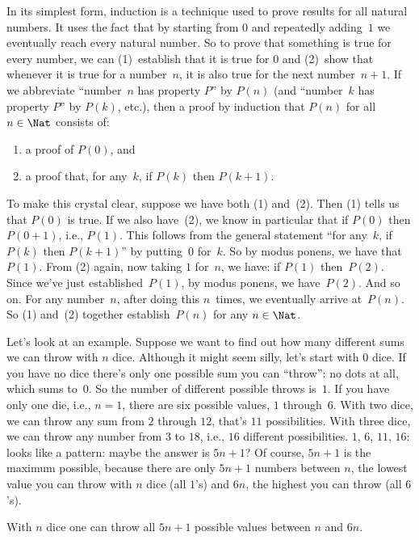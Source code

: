 \documentclass[../../../include/open-logic-section]{subfiles}
\begin{document}


In its simplest form, induction is a technique used to prove results
for all natural numbers. It uses the fact that by starting from $0$
and repeatedly adding~$1$ we eventually reach every natural number. So
to prove that something is true for every number, we can (1)~establish
that it is true for $0$ and (2)~show that whenever it is true for a
number~$n$, it is also true for the next number~$n+1$.  If we
abbreviate ``number~$n$ has property $P$'' by $P(n)$ (and ``number~$k$
has property $P$'' by $P(k)$, etc.), then a proof by induction that
$P(n)$ for all $n \in \Nat$ consists of:
\begin{enumerate}
\item a proof of $P(0)$, and
\item a proof that, for any~$k$, if $P(k)$ then $P(k+1)$.
\end{enumerate}
To make this crystal clear, suppose we have both (1) and~(2).  Then
(1) tells us that $P(0)$ is true.  If we also have~(2), we know in
particular that if $P(0)$ then $P(0+1)$, i.e., $P(1)$. This follows
from the general statement ``for any~$k$, if $P(k)$ then $P(k+1)$'' by
putting~$0$ for~$k$. So by modus ponens, we have that~$P(1)$. From (2)
again, now taking $1$ for~$n$, we have: if $P(1)$ then~$P(2)$. Since
we've just established~$P(1)$, by modus ponens, we have~$P(2)$. And so
on.  For any number~$n$, after doing this $n$~times, we eventually
arrive at~$P(n)$.  So (1) and~(2) together establish~$P(n)$ for any $n
\in \Nat$.

Let's look at an example.  Suppose we want to find out how many
different sums we can throw with $n$ dice.  Although it might seem
silly, let's start with $0$ dice.  If you have no dice there's only one
possible sum you can ``throw'': no dots at all, which sums to~$0$. So
the number of different possible throws is~$1$. If you have only one
die, i.e., $n=1$, there are six possible values, $1$ through~$6$. With
two dice, we can throw any sum from $2$ through $12$, that's $11$
possibilities.  With three dice, we can throw any number from $3$ to
$18$, i.e., $16$ different possibilities.  $1$, $6$, $11$, $16$: looks
like a pattern: maybe the answer is $5n+1$?  Of course, $5n+1$ is the
maximum possible, because there are only $5n+1$ numbers between $n$,
the lowest value you can throw with $n$ dice (all $1$'s) and $6n$, the
highest you can throw (all $6$'s).

\begin{thm}
  With $n$ dice one can throw all $5n+1$ possible values between $n$
  and $6n$.
\end{thm}
\end{document}
